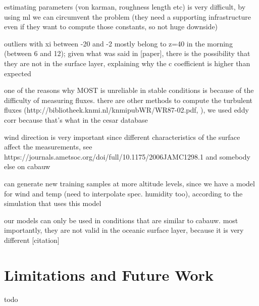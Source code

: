 \documentclass[a4paper]{book}
\begin{document}
estimating parameters (von karman, roughness length etc) is very difficult, by using ml we can circumvent the problem (they need a supporting infrastructure even if they want to compute those constants, so not huge downside)

outliers with xi between -20 and -2 mostly belong to z=40 in the morning (between 6 and 12); given what was said in [paper], there is the possibility that they are not in the surface layer, explaining why the c coefficient is higher than expected

one of the reasons why MOST is unreliable in stable conditions is because of the difficulty of measuring fluxes. there are other methods to compute the turbulent fluxes (http://bibliotheek.knmi.nl/knmipubWR/WR87-02.pdf, ), we used eddy corr because that's what in the cesar database

wind direction is very important since different characteristics of the surface affect the measurements, see https://journals.ametsoc.org/doi/full/10.1175/2006JAMC1298.1 and somebody else on cabauw

can generate new training samples at more altitude levels, since we have a model for wind and temp (need to interpolate spec. humidity too), according to the simulation that uses this model

our models can only be used in conditions that are similar to cabauw. most importantly, they are not valid in the oceanic surface layer, because it is very different [citation]

\section{Limitations and Future Work}
todo


%
%


\end{document}
